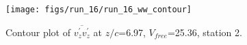 \begin{figure}[H]
\centering
\texttt{[image: figs/run\_16/run\_16\_ww\_contour]}
\caption{Contour plot of $\overline{v_{z}^{\prime} v_{z}^{\prime}}$ at $z/c$=6.97, $V_{free}$=25.36, station 2.}
\label{fig:run_16_ww_contour}
\end{figure}



